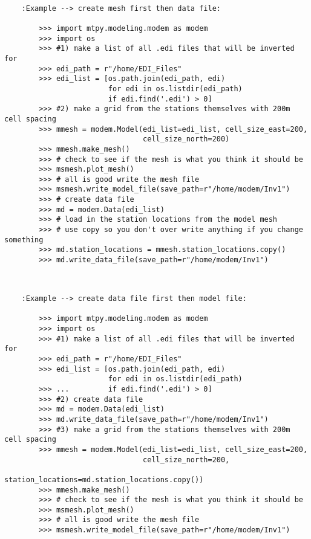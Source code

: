 \begin{verbatim}
  
    :Example --> create mesh first then data file: 
    
        >>> import mtpy.modeling.modem as modem
        >>> import os
        >>> #1) make a list of all .edi files that will be inverted for 
        >>> edi_path = r"/home/EDI_Files"
        >>> edi_list = [os.path.join(edi_path, edi) 
                        for edi in os.listdir(edi_path) 
                        if edi.find('.edi') > 0]
        >>> #2) make a grid from the stations themselves with 200m cell spacing
        >>> mmesh = modem.Model(edi_list=edi_list, cell_size_east=200, 
                                cell_size_north=200)
        >>> mmesh.make_mesh()
        >>> # check to see if the mesh is what you think it should be
        >>> msmesh.plot_mesh()
        >>> # all is good write the mesh file
        >>> msmesh.write_model_file(save_path=r"/home/modem/Inv1")
        >>> # create data file
        >>> md = modem.Data(edi_list)
        >>> # load in the station locations from the model mesh
        >>> # use copy so you don't over write anything if you change something
        >>> md.station_locations = mmesh.station_locations.copy()
        >>> md.write_data_file(save_path=r"/home/modem/Inv1")
        
\end{verbatim} 
    
\begin{verbatim}

    :Example --> create data file first then model file: 
    
        >>> import mtpy.modeling.modem as modem
        >>> import os
        >>> #1) make a list of all .edi files that will be inverted for 
        >>> edi_path = r"/home/EDI_Files"
        >>> edi_list = [os.path.join(edi_path, edi) 
                        for edi in os.listdir(edi_path) 
        >>> ...         if edi.find('.edi') > 0]
        >>> #2) create data file
        >>> md = modem.Data(edi_list)
        >>> md.write_data_file(save_path=r"/home/modem/Inv1")
        >>> #3) make a grid from the stations themselves with 200m cell spacing
        >>> mmesh = modem.Model(edi_list=edi_list, cell_size_east=200, 
                                cell_size_north=200, 
                                station_locations=md.station_locations.copy())
        >>> mmesh.make_mesh()
        >>> # check to see if the mesh is what you think it should be
        >>> msmesh.plot_mesh()
        >>> # all is good write the mesh file
        >>> msmesh.write_model_file(save_path=r"/home/modem/Inv1")
\end{verbatim}

